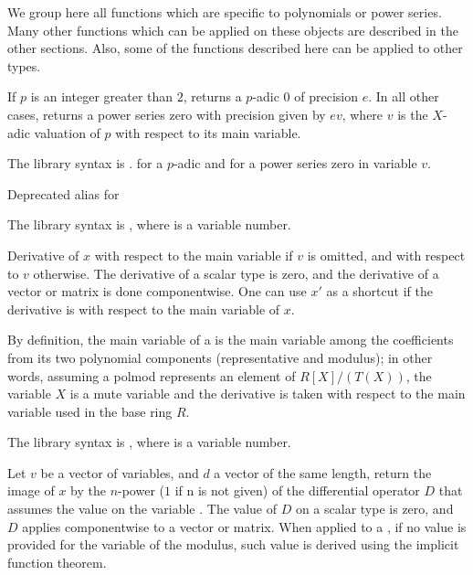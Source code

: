 We group here all functions which are specific to polynomials or power
series. Many other functions which can be applied on these objects are
described in the other sections. Also, some of the functions described here
can be applied to other types.


\label{se:O}
If $p$ is an integer
greater than $2$, returns a $p$-adic $0$ of precision $e$. In all other
cases, returns a power series zero with precision given by $e v$, where $v$
is the $X$-adic valuation of $p$ with respect to its main variable.

The library syntax is .
 for a $p$-adic and
 for a power series zero in variable $v$.

\label{se:bezoutres}
Deprecated alias for 

The library syntax is , where  is a variable number.

\label{se:deriv}
Derivative of $x$ with respect to the main
variable if $v$ is omitted, and with respect to $v$ otherwise. The derivative
of a scalar type is zero, and the derivative of a vector or matrix is done
componentwise. One can use $x'$ as a shortcut if the derivative is with
respect to the main variable of $x$.

By definition, the main variable of a  is the main variable among
the coefficients from its two polynomial components (representative and
modulus); in other words, assuming a polmod represents an element of
$R[X]/(T(X))$, the variable $X$ is a mute variable and the derivative is
taken with respect to the main variable used in the base ring $R$.

The library syntax is , where  is a variable number.

\label{se:diffop}
Let $v$ be a vector of variables, and $d$ a vector of the same length,
return the image of $x$ by the $n$-power ($1$ if n is not given) of the differential
operator $D$ that assumes the value  on the variable .
The value of $D$ on a scalar type is zero, and $D$ applies componentwise to a vector
or matrix. When applied to a , if no value is provided for the variable
of the modulus, such value is derived using the implicit function theorem.


